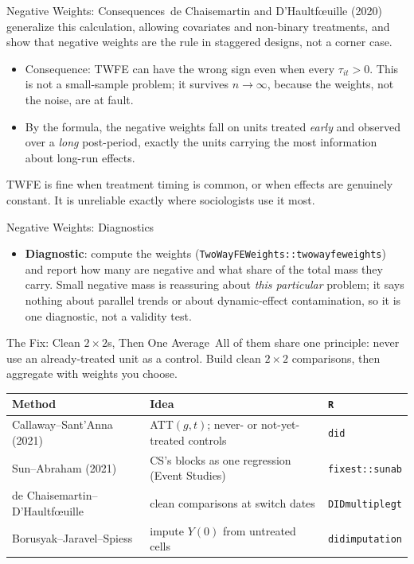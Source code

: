 \documentclass[aspectratio=169,11pt,xcolor=dvipsnames]{beamer}
\newcommand{\srct}[1]{#1}
\newcommand{\adv}{\,\raisebox{0.6pt}{\textcolor{accent}{$\bigstar$}}}
\newcommand{\core}{\,\raisebox{0.6pt}{\textcolor{corestar}{$\bigstar$}}}
\begin{document}
\begin{frame}{Negative Weights: Consequences\adv}
\srct{de Chaisemartin and D'Haultf\oe uille (2020)} generalize this
calculation, allowing covariates and non-binary treatments, and show
that negative weights are the rule in staggered designs, not a corner case.
\vskip3pt
\begin{itemize}\itemsep3pt
  \item Consequence: TWFE can have the \alert{wrong sign} even when every
        $\tau_{it} > 0$. This is not a small-sample problem; it survives
        $n\to\infty$, because the weights, not the noise, are at fault.
  \item By the formula, the negative weights fall on units treated \emph{early}
        and observed over a \emph{long} post-period, exactly the units carrying
        the most information about long-run effects.
\end{itemize}
\vskip3pt
\alert{TWFE is fine when treatment timing is common, or when effects are
genuinely constant.} It is unreliable exactly where sociologists use it most.
\end{frame}

\begin{frame}{Negative Weights: Diagnostics\adv}
\begin{itemize}\itemsep5pt
  \item \textbf{Diagnostic}: compute the weights
        (\texttt{TwoWayFEWeights::twowayfeweights}) and report how many are
        negative and what share of the total mass they carry. Small negative
        mass is reassuring about \emph{this particular} problem; it says nothing
        about parallel trends or about dynamic-effect contamination, so it is
        one diagnostic, not a validity test.
\end{itemize}
\end{frame}

\begin{frame}{The Fix: Clean $2\times2$s, Then One Average\core}
All of them share one principle: \alert{never use an already-treated unit as a
control}. Build clean $2\times 2$ comparisons, then aggregate with weights you
choose.
\vskip3pt
\begin{center}\footnotesize
\renewcommand{\arraystretch}{1.35}
\begin{tabular}{lll}
\toprule
Method & Idea & \texttt{R} \\
\midrule
Callaway--Sant'Anna (2021) & ATT$(g,t)$; never- or not-yet-treated controls & \texttt{did} \\
Sun--Abraham (2021) & CS's blocks as one regression (Event Studies) & \texttt{fixest::sunab} \\
de Chaisemartin--D'Haultf\oe uille & clean comparisons at switch dates &
  \texttt{DIDmultiplegt} \\
Borusyak--Jaravel--Spiess & impute $Y(0)$ from untreated cells &
  \texttt{didimputation} \\
\bottomrule
\end{tabular}
\end{center}
\end{frame}
\end{document}
